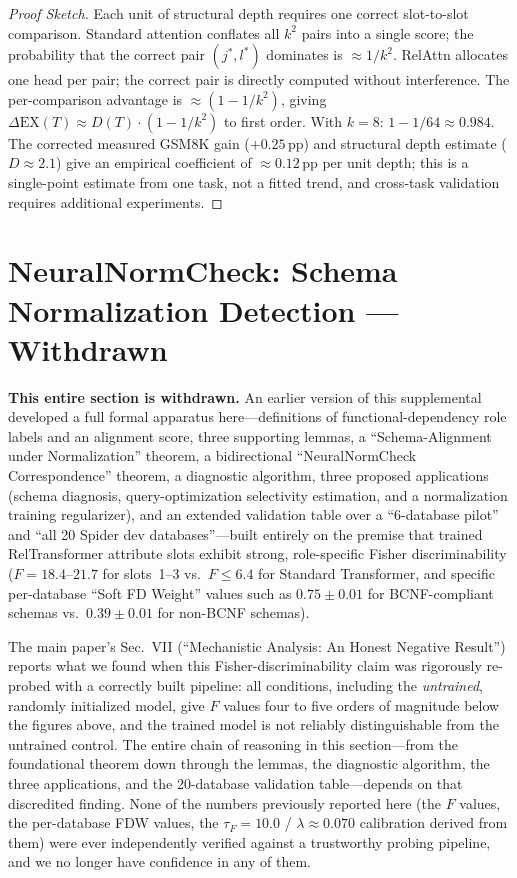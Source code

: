 \documentclass[conference]{IEEEtran}
\begin{document}
\begin{proof}[Proof Sketch]
	\renewcommand{\qedsymbol}{}
Each unit of structural depth requires one correct slot-to-slot comparison. Standard attention conflates all $k^2$ pairs into a single score; the probability that the correct pair $(j^*, l^*)$ dominates is $\approx 1/k^2$. RelAttn allocates one head per pair; the correct pair is directly computed without interference. The per-comparison advantage is $\approx(1 - 1/k^2)$, giving $\Delta\mathrm{EX}(T) \approx D(T) \cdot (1 - 1/k^2)$ to first order. With $k=8$: $1 - 1/64 \approx 0.984$. The corrected measured GSM8K gain ($+0.25$\,pp) and structural depth estimate ($D \approx 2.1$) give an empirical coefficient of $\approx 0.12$\,pp per unit depth; this is a single-point estimate from one task, not a fitted trend, and cross-task validation requires additional experiments.
\end{proof}

\section{NeuralNormCheck: Schema Normalization Detection --- Withdrawn}
\label{app:normcheck}
\label{app:neuralnormcheck}

\textbf{This entire section is withdrawn.} An earlier version of this supplemental developed a full formal apparatus here---definitions of functional-dependency role labels and an alignment score, three supporting lemmas, a ``Schema-Alignment under Normalization'' theorem, a bidirectional ``NeuralNormCheck Correspondence'' theorem, a diagnostic algorithm, three proposed applications (schema diagnosis, query-optimization selectivity estimation, and a normalization training regularizer), and an extended validation table over a ``6-database pilot'' and ``all 20 Spider dev databases''---built entirely on the premise that trained RelTransformer attribute slots exhibit strong, role-specific Fisher discriminability ($F = 18.4$--$21.7$ for slots~1--3 vs.\ $F \leq 6.4$ for Standard Transformer, and specific per-database ``Soft FD Weight'' values such as $0.75\pm0.01$ for BCNF-compliant schemas vs.\ $0.39\pm0.01$ for non-BCNF schemas).

The main paper's Sec.~VII (``Mechanistic Analysis: An Honest Negative Result'') reports what we found when this Fisher-discriminability claim was rigorously re-probed with a correctly built pipeline: all conditions, including the \emph{untrained}, randomly initialized model, give $F$ values four to five orders of magnitude below the figures above, and the trained model is not reliably distinguishable from the untrained control. The entire chain of reasoning in this section---from the foundational theorem down through the lemmas, the diagnostic algorithm, the three applications, and the 20-database validation table---depends on that discredited finding. None of the numbers previously reported here (the $F$ values, the per-database FDW values, the $\tau_F{=}10.0$ / $\lambda{\approx}0.070$ calibration derived from them) were ever independently verified against a trustworthy probing pipeline, and we no longer have confidence in any of them.
\end{document}
